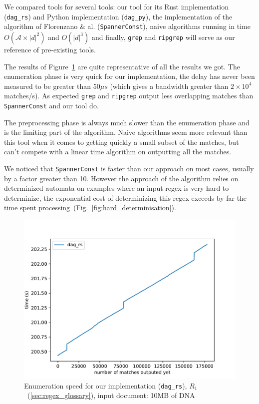 \documentclass[12px]{article}
\theoremstyle{definition}
\begin{document}
      We compared tools for several tools: our tool for its Rust implementation
      (\texttt{dag\_rs}) and Python implementation (\texttt{dag\_py}), the
      implementation of the algorithm of Florenzano \& al.
      \cite{florenzano2018constant} (\texttt{SpannerConst}), naive algorithms
      running in time $O(\mathcal{A} \times |d|^2)$ and $O(|d|^3)$ and finally,
      \texttt{grep} and \texttt{ripgrep} will serve as our reference of
      pre-existing tools.

      The results of Figure~\ref{fig:bench} are quite representative of all the
      results we got. The enumeration phase is very quick for our
      implementation, the delay has never been measured to be greater than $50
      \mu s$ (which gives a bandwidth greater than $2 \times 10^4$ matches/s).
      As expected \texttt{grep} and \texttt{ripgrep} output less overlapping
      matches than \texttt{SpannerConst} and our tool do.

      The preprocessing phase is always much slower than the enumeration phase
      and is the limiting part of the algorithm. Naive algorithms seem more
      relevant than this tool when it comes to getting quickly a small subset
      of the matches, but can't compete with a linear time algorithm on
      outputting all the matches.

      We noticed that \texttt{SpannerConst} is faster than our approach on most
      cases, usually by a factor greater than 10. However the approach of the
      algorithm relies on determinized automata on examples where an input
      regex is very hard to determinize, the exponential cost of determinizing
      this regex exceeds by far the time spent
      processing~(Fig.~\ref{fig:hard_determinisation}).


      \begin{figure}%
        \label{fig:bench}
        \caption{
          Enumeration speed for our implementation (\texttt{dag\_rs}),
          $R_1$~(\ref{sec:regex_glossary}), input document: 10MB of DNA }
        \center\includegraphics[width=5in]{figures/bench_enum_only}
      \end{figure}
\end{document}
